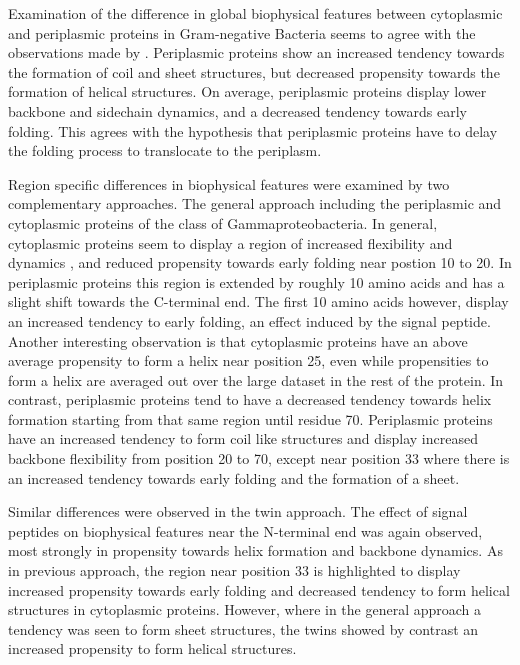 Examination of the difference in global biophysical features between cytoplasmic and periplasmic proteins in Gram-negative Bacteria seems to agree with the observations made by \cite{loos2019}.
Periplasmic proteins show an increased tendency towards the formation of coil and sheet structures,
but decreased propensity towards the formation of helical structures.
On average, periplasmic proteins display lower backbone and sidechain dynamics,
and a decreased tendency towards early folding.
This agrees with the hypothesis that periplasmic proteins have to delay the folding process to translocate to the periplasm.

Region specific differences in biophysical features were examined by two complementary approaches.
The general approach including the periplasmic and cytoplasmic proteins of the class of Gammaproteobacteria.
In general, cytoplasmic proteins seem to display a region of increased flexibility and dynamics , and reduced propensity towards early folding near postion 10 to 20. 
In periplasmic proteins this region is extended by roughly 10 amino acids and has a slight shift towards the C-terminal end.
The first 10 amino acids however, 
display an increased tendency to early folding, 
an effect induced by the signal peptide.
Another interesting observation is that cytoplasmic proteins have an above average propensity to form a helix near position 25,
even while propensities to form a helix are averaged out over the large dataset in the rest of the protein.
In contrast, periplasmic proteins tend to have a decreased tendency towards helix formation starting from that same region until residue 70.
Periplasmic proteins have an increased tendency to form coil like structures and display increased backbone flexibility from position 20 to 70, 
except near position 33 where there is an increased tendency towards early folding and the formation of a sheet.

Similar differences were observed in the twin approach.
The effect of signal peptides on biophysical features near the N-terminal end was again observed,
most strongly in propensity towards helix formation and backbone dynamics.
As in previous approach, the region near position 33 is highlighted to display increased propensity towards early folding and decreased tendency to form helical structures in cytoplasmic proteins.
However, where in the general approach a tendency was seen to form sheet structures,
the twins showed by contrast an increased propensity to form helical structures.

